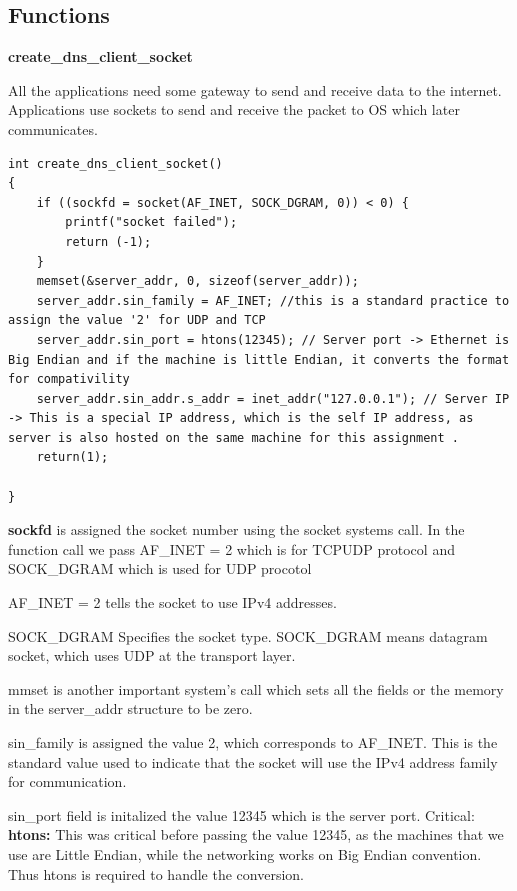\documentclass[12pt, a4paper]{report}
\begin{document}
\subsection{Functions}

\textbf{create\_dns\_client\_socket}

All the applications need some gateway to send and receive data to the internet. Applications use sockets to send and receive the packet to OS which later communicates.

\begin{lstlisting}[caption={create\_dns\_client\_socket}]
int create_dns_client_socket()
{
    if ((sockfd = socket(AF_INET, SOCK_DGRAM, 0)) < 0) {
        printf("socket failed");
        return (-1);
    }
    memset(&server_addr, 0, sizeof(server_addr));
    server_addr.sin_family = AF_INET; //this is a standard practice to assign the value '2' for UDP and TCP
    server_addr.sin_port = htons(12345); // Server port -> Ethernet is Big Endian and if the machine is little Endian, it converts the format for compativility
    server_addr.sin_addr.s_addr = inet_addr("127.0.0.1"); // Server IP -> This is a special IP address, which is the self IP address, as server is also hosted on the same machine for this assignment .
    return(1);

}
\end{lstlisting}

\textbf{sockfd} is assigned the socket number using the socket systems call. In the function call we pass AF\_INET = 2 which is for TCP\/UDP protocol and SOCK\_DGRAM which is used for UDP procotol

AF\_INET = 2 tells the socket to use IPv4 addresses.

SOCK\_DGRAM Specifies the socket type. SOCK\_DGRAM means datagram socket, which uses UDP at the transport layer.

mmset is another important system's call which sets all the fields or the memory in the server\_addr structure to be zero.

sin\_family is assigned the value 2, which corresponds to AF\_INET. This is the standard value used to indicate that the socket will use the IPv4 address family for communication.

sin\_port field is initalized the value 12345 which is the server port. Critical: \textbf{htons: } This was critical before passing the value 12345, as the machines that we use are Little Endian, while the networking works on Big Endian convention. Thus htons is required to handle the conversion.
\end{document}
